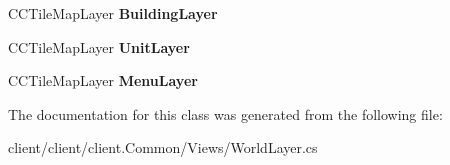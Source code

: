 \begin{DoxyCompactItemize}
\item 
\hypertarget{classClient_1_1Common_1_1Views_1_1WorldLayer_a1e5285954c32c948cbbb6c3b11f39bc5}{C\-C\-Tile\-Map\-Layer {\bfseries Building\-Layer}}\label{classClient_1_1Common_1_1Views_1_1WorldLayer_a1e5285954c32c948cbbb6c3b11f39bc5}

\item 
\hypertarget{classClient_1_1Common_1_1Views_1_1WorldLayer_af56bd228892f4cd8f354c8270e97020f}{C\-C\-Tile\-Map\-Layer {\bfseries Unit\-Layer}}\label{classClient_1_1Common_1_1Views_1_1WorldLayer_af56bd228892f4cd8f354c8270e97020f}

\item 
\hypertarget{classClient_1_1Common_1_1Views_1_1WorldLayer_aed55542d07b095c07bf54cab0070ee33}{C\-C\-Tile\-Map\-Layer {\bfseries Menu\-Layer}}\label{classClient_1_1Common_1_1Views_1_1WorldLayer_aed55542d07b095c07bf54cab0070ee33}

\end{DoxyCompactItemize}


The documentation for this class was generated from the following file\-:\begin{DoxyCompactItemize}
\item 
client/client/client.\-Common/\-Views/World\-Layer.\-cs\end{DoxyCompactItemize}
